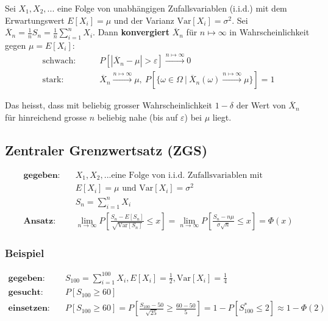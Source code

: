 \documentclass[11pt]{article}
\newcommand{\Var}{\text{Var}}
\begin{document}
Sei $X_1, X_2, ...$ eine Folge von unabh{\"a}ngigen Zufallsvariablen (i.i.d.) mit dem Erwartungswert $E[X_i] = \mu$ und der Varianz $\Var[X_i] = \sigma^2$. Sei $\overline{X}_n = \frac{1}{n}S_n = \frac{1}{n}\sum_{i=1}^n X_i$. Dann \textbf{konvergiert} $\overline{X}_n$ f{\"u}r $n \mapsto \infty$ in Wahrscheinlichkeit gegen $\mu = E[X_i]$:
\begin{equation*}
\begin{split}
	\text{schwach:} & \qquad P[|\overline{X}_n - \mu| > \varepsilon] \xrightarrow{n \mapsto \infty} 0 \\
	\text{stark:} & \qquad \overline{X}_n \xrightarrow{n\mapsto\infty}\mu,\ P[\{\omega \in \Omega\ |\  \overline{X}_n(\omega) \xrightarrow{n\mapsto\infty}\mu\}] = 1 
\end{split}
\end{equation*}

Das heisst, dass mit beliebig grosser Wahrscheinlichkeit $1- \delta$ der Wert von $\overline{X}_n$ f{\"u}r hinreichend grosse $n$ beliebig nahe (bis auf $\varepsilon$) bei $\mu$ liegt.

\subsection{Zentraler Grenzwertsatz (ZGS)}

\begin{equation*}
\begin{split}
	\textbf{gegeben:} \quad & X_1, X_2, ... \text{eine Folge von i.i.d. Zufallsvariablen mit} \\
	& E[X_i] = \mu \text{ und } \Var[X_i] = \sigma^2 \\
	& S_n = \sum_{i=1}^n X_i \\
	\textbf{Ansatz:}\quad & \lim_{n\rightarrow\infty} P[\frac{S_n - E[S_n]}{\sqrt{\Var[S_n]}} \leq x] =	\lim_{n\rightarrow\infty} P[\frac{S_n - n\mu}{\sigma \sqrt{n}} \leq x] = \Phi(x)
\end{split}
\end{equation*}

\subsubsection{Beispiel}

\begin{equation*}
\begin{split}
	\textbf{gegeben:} \quad & S_{100} = \sum_{i=1}^100 X_i, E[X_i] = \frac{1}{2}, \Var[X_i] = \frac{1}{4} \\
	\textbf{gesucht:} \quad & P[S_{100} \geq 60] \\
	\textbf{einsetzen:}\quad & P[S_{100} \geq 60] = P[\frac{S_{100} - 50}{\sqrt{25}} \geq \frac{60 - 50}{5}] = 1 - P[S_{100}^* \leq 2] \approx 1 - \Phi(2)
\end{split}
\end{equation*}
\end{document}
